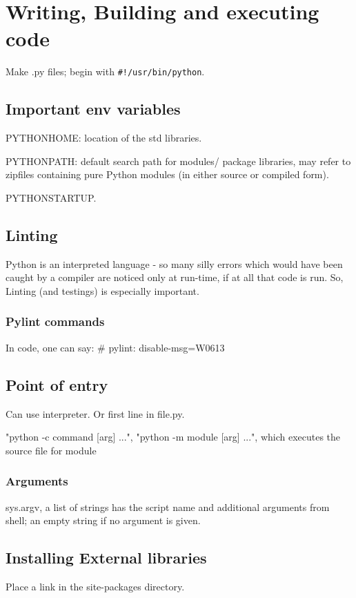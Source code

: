 \section{Writing, Building and executing code}
Make .py files; begin with \verb'#!/usr/bin/python'.

\subsection{Important env variables}
PYTHONHOME: location of the std libraries.

PYTHONPATH: default search path for modules/ package libraries, may refer to zipfiles containing pure Python modules (in either source or compiled form).

PYTHONSTARTUP.

\subsection{Linting}
Python is an interpreted language - so many silly errors which would have been caught by a compiler are noticed only at run-time, if at all that code is run. So, Linting (and testings) is especially important.

\subsubsection{Pylint commands}
In code, one can say:
\# pylint: disable-msg=W0613

\subsection{Point of entry}
Can use interpreter. Or first line in file.py.

"python -c command [arg] ...", "python -m module [arg] ...", which executes the source file for module

\subsubsection{Arguments}
sys.argv, a list of strings has the script name and additional arguments from shell; an empty string if no argument is given.

\subsection{Installing External libraries}
Place a link in the site-packages directory.


